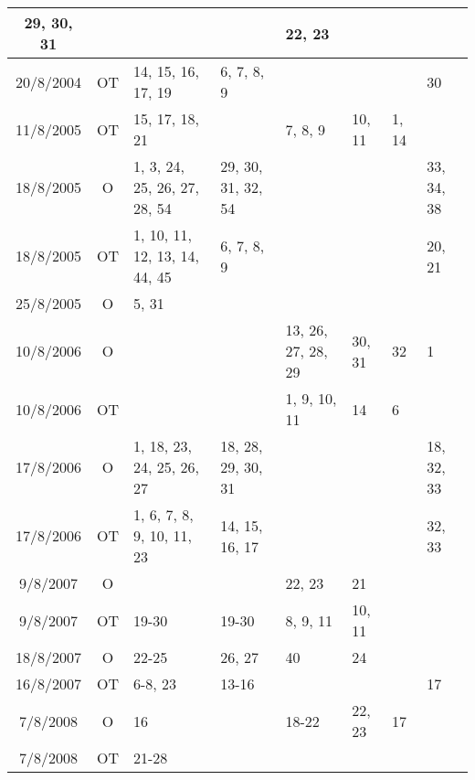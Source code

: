 \begin{longtable}{|c|c|p{1.85cm}|p{1.85cm}|p{1.85cm}|p{1.85cm}|p{1.85cm}|p{1.85cm}|}
	\raggedright 29, 30, 31 &
	\raggedright &
	\raggedright &
	\raggedright &
	\raggedright 22, 23
	\tabularnewline
\hline
	20/8/2004	&
	OT	&
	\raggedright 14, 15, 16, 17, 19 &
	\raggedright 6, 7, 8, 9 &
	\raggedright &
	\raggedright &
	\raggedright &
	\raggedright 30
	\tabularnewline
\hline
	11/8/2005	&
	OT	&
	\raggedright 15, 17, 18, 21 &
	\raggedright &
	\raggedright 7, 8, 9 &
	\raggedright 10, 11 &
	\raggedright 1, 14 &
	\raggedright 
	\tabularnewline
\hline
	18/8/2005	&
	O	&
	\raggedright 1, 3, 24, 25, 26, 27, 28, 54 &
	\raggedright 29, 30, 31, 32, 54 &
	\raggedright &
	\raggedright &
	\raggedright &
	\raggedright 33, 34, 38
	\tabularnewline
\hline
	18/8/2005	&
	OT	&
	\raggedright 1, 10, 11, 12, 13, 14, 44, 45 &
	\raggedright 6, 7, 8, 9 &
	\raggedright &
	\raggedright &
	\raggedright &
	\raggedright 20, 21
	\tabularnewline
\hline
	25/8/2005	&
	O	&
	\raggedright 5, 31 &
	\raggedright &
	\raggedright &
	\raggedright &
	\raggedright &
	\raggedright 
	\tabularnewline
\hline
	10/8/2006	&
	O	&
	\raggedright &
	\raggedright &
	\raggedright 13, 26, 27, 28, 29 &
	\raggedright 30, 31 &
	\raggedright 32 &
	\raggedright 1
	\tabularnewline
\hline
	10/8/2006	&
	OT	&
	\raggedright &
	\raggedright &
	\raggedright 1, 9, 10, 11 &
	\raggedright 14 &
	\raggedright 6 &
	\raggedright 
	\tabularnewline
\hline
	17/8/2006	&
	O	&
	\raggedright 1, 18, 23, 24, 25, 26, 27 &
	\raggedright 18, 28, 29, 30, 31 &
	\raggedright &
	\raggedright &
	\raggedright &
	\raggedright 18, 32, 33
	\tabularnewline
\hline
	17/8/2006	&
	OT	&
	\raggedright 1, 6, 7, 8, 9, 10, 11, 23 &
	\raggedright 14, 15, 16, 17 &
	\raggedright &
	\raggedright &
	\raggedright &
	\raggedright 32, 33
	\tabularnewline
\hline
    9/8/2007    &
    O    &
    \raggedright &
	\raggedright &
	\raggedright 22, 23 &
	\raggedright 21 &
	\raggedright &
	\raggedright 
	\tabularnewline
\hline
    9/8/2007    &
    OT    &
    \raggedright 19-30 &
	\raggedright 19-30 &
	\raggedright 8, 9, 11 &
	\raggedright 10, 11 &
	\raggedright &
	\raggedright 
	\tabularnewline
\hline
    18/8/2007    &
    O    &
    \raggedright 22-25 &
	\raggedright 26, 27 &
	\raggedright 40 &
	\raggedright 24 &
	\raggedright &
	\raggedright 
	\tabularnewline
\hline
    16/8/2007    &
    OT    &
    \raggedright 6-8, 23 &
	\raggedright 13-16 &
	\raggedright &
	\raggedright &
	\raggedright &
	\raggedright 17
	\tabularnewline
\hline
    7/8/2008    &
    O    &
    \raggedright 16 &
	\raggedright &
	\raggedright 18-22 &
	\raggedright 22, 23 &
	\raggedright 17 &
	\raggedright 
	\tabularnewline
\hline
    7/8/2008    &
    OT    &
    \raggedright 21-28 &

\end{longtable}
